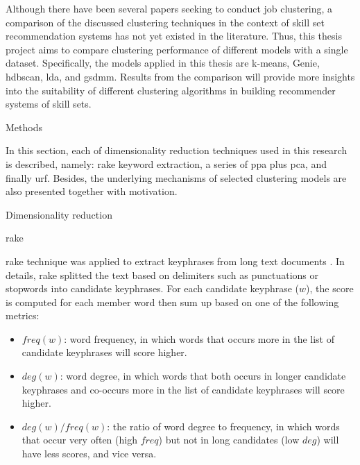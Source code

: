 \documentclass[a4paper,man,floatsintext,natbib,noextraspace]{apa6}
\makeatletter
\renewcommand{\section}{\@startsection {section}{1}
  {\z@}
  {\b@level@one@skip}
  {\e@level@one@skip}
  {\centering\normalfont\bfseries}}
\renewcommand{\subsection}{\@startsection{subsection}{2}
  {\z@}
  {\b@level@two@skip}
  {\e@level@two@skip}
  {\normalfont\normalsize\bfseries}}
\renewcommand{\subsubsection}{\@startsection{subsubsection}{3}
  {\z@}
  {\b@level@two@skip}
  {\e@level@two@skip}
  {\normalfont\normalsize\bfseries\itshape}}
\makeatother
\begin{document}
Although there have been several papers seeking to conduct job clustering, a comparison of the discussed clustering techniques in the context of skill set recommendation systems has not yet existed in the literature. Thus, this thesis project aims to compare clustering performance of different models with a single dataset. Specifically, the models applied in this thesis are k-means, Genie, \gls{hdbscan}, \gls{lda}, and \gls{gsdmm}. Results from the comparison will provide more insights into the suitability of different clustering algorithms in building recommender systems of skill sets.

\section{Methods}

In this section, each of dimensionality reduction techniques used in this research is described, namely:  \gls{rake} keyword extraction, a series of \gls{ppa} plus \gls{pca}, and finally \gls{urf}. Besides, the underlying mechanisms of selected clustering models are also presented together with motivation.

\subsection{Dimensionality reduction}

\subsubsection{\gls{rake}}

\gls{rake} technique was applied to extract keyphrases from long text documents \citep{roseAutomaticKeywordExtraction2010}. In details, \gls{rake} splitted the text based on delimiters such as punctuations or stopwords into candidate keyphrases. For each candidate keyphrase ($w$), the score is computed for each member word then sum up based on one of the following metrics:

\begin{itemize}
    \item $freq(w)$: word frequency, in which words that occurs more in the list of candidate keyphrases will score higher.
    \item $deg(w)$: word degree, in which words that both occurs in longer candidate keyphrases and co-occurs more in the list of candidate keyphrases will score higher.
    \item $deg(w)/freq(w)$: the ratio of word degree to frequency, in which words that occur very often (high $freq$) but not in long candidates (low $deg$) will have less scores, and vice versa.
\end{itemize}
\end{document}
